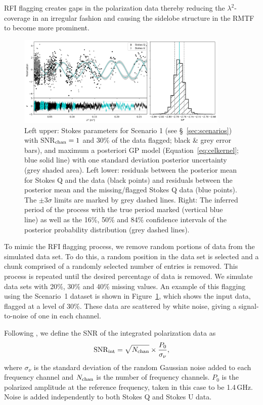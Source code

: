 \documentclass[fleqn,usenatbib]{mnras}
\begin{document}
RFI flagging creates gaps in the polarization data thereby reducing the $\lambda^{2}$-coverage in an irregular fashion and causing the sidelobe structure in the RMTF to become more prominent.
%
\begin{figure}
\includegraphics[width=0.9\textwidth]{./FIGURES/diff_case1_minus40_n1.png}
\caption{\label{fig:scenario1} Left upper: Stokes parameters for Scenario 1 (see \S~\ref{sec:scenarios}) with SNR$_{\rm chan}=1$ and 30\% of the data flagged; black \& grey error bars), and maximum a posteriori GP model (Equation~\ref{eq:celkernel}; blue solid line) with one standard deviation posterior uncertainty (grey shaded area). Left lower: residuals between the posterior mean for Stokes Q and the data (black points) and residuals between the posterior mean and the missing/flagged Stokes Q data (blue points). The $\pm3\sigma$ limits are marked by grey dashed lines. Right: The inferred period of the process with the true period marked (vertical blue line) as well as the 16\%, 50\% and 84\% confidence intervals of the posterior probability distribution (grey dashed lines).}
\end{figure}
%
To mimic the RFI flagging process, we remove random portions of data from the simulated data set. To do this, a random position in the data set is selected and a chunk comprised of a randomly selected number of entries is removed. This process is repeated until the desired percentage of data is removed. We simulate data sets with 20\%, 30\% and 40\% missing values. An example of this flagging using the Scenario~1 dataset is shown in Figure~\ref{fig:scenario1}, which shows the input data, flagged at a level of 30\%. These data are scattered by white noise, giving a signal-to-noise of one in each channel. 

Following \cite{2018arXiv180604326S}, we define the SNR of the integrated polarization data as
%
\begin{equation}
{\rm SNR}_{\rm int} = \sqrt{N_{\rm chan}} \times \frac{P_0}{\sigma_{\nu}},
\end{equation}
%
where $\sigma_{\nu}$ is the standard deviation of the random Gaussian noise added to each frequency channel and $N_{\rm chan}$ is the number of frequency channels. $P_0$ is the polarized amplitude at the reference frequency, taken in this case to be 1.4\,GHz. Noise is added independently to both Stokes Q and Stokes U data.
\end{document}
